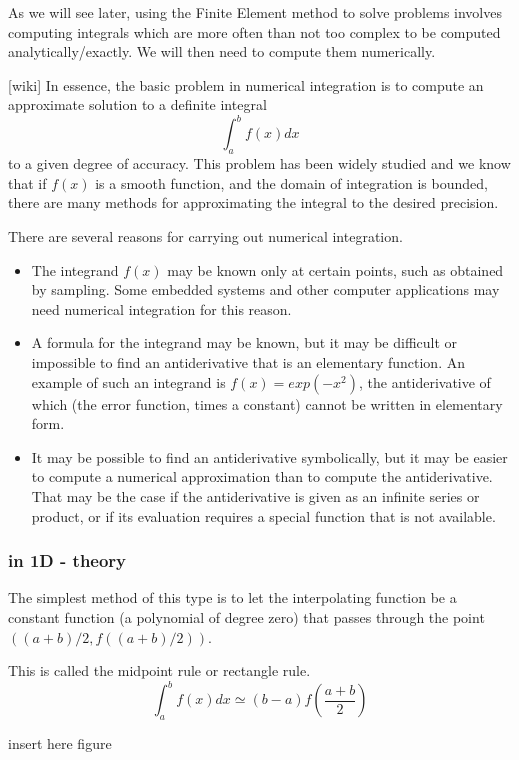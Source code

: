 As we will see later, using the Finite Element method to solve problems involves computing integrals which are more often than not too complex to be computed analytically/exactly. We will then need to compute them numerically.

[wiki] In essence, 
the basic problem in numerical integration is to compute an approximate solution to a definite integral
\[
\int_a^b f(x) dx
\]
to a given degree of accuracy.
This problem has been widely studied \cite{XYZ} and we know that 
if $f(x)$ is a smooth function, and the domain of integration is bounded, there are many methods for approximating the integral to the desired precision.

There are several reasons for carrying out numerical integration.
\begin{itemize}
\item The integrand $f(x)$ may be known only at certain points, such as obtained by sampling. Some embedded systems and other computer applications may need numerical integration for this reason.
\item A formula for the integrand may be known, but it may be difficult or impossible to find an antiderivative that is an elementary function. An example of such an integrand is $f(x)=exp(-x^2)$, the antiderivative of which (the error function, times a constant) cannot be written in elementary form.
\item It may be possible to find an antiderivative symbolically, but it may be easier to compute a numerical approximation than to compute the antiderivative. That may be the case if the antiderivative is given as an infinite series or product, or if its evaluation requires a special function that is not available.
\end{itemize}

\subsubsection{in 1D - theory}

The simplest method of this type is to let the interpolating function be a constant function (a polynomial of degree zero) that passes through the point $((a+b)/2, f((a+b)/2))$.

This is called the midpoint rule  or rectangle rule. 
\[
\int_a^b f(x)dx \simeq (b-a) f(\frac{a+b}{2})
\]

{\color{red} insert here figure}


